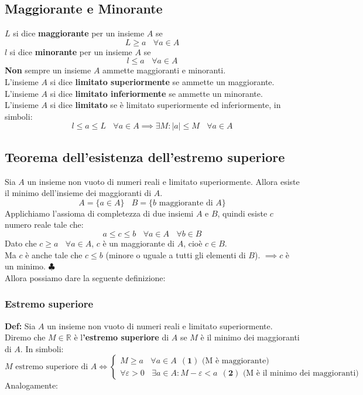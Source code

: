 \documentclass{article}
\newcommand{\R}{\mathbb{R}}
\begin{document}
\subsection{Maggiorante e Minorante}
$L$ si dice \textbf{maggiorante} per un insieme $A$ se
\[
    L \geq a \ \ \ \ \forall a \in A
\]
$l$ si dice \textbf{minorante} per un insieme $A$ se
\[
    l \leq a \ \ \ \ \forall a \in A
\]
\textbf{Non} sempre un insieme $A$ ammette maggioranti e minoranti.\\
L'insieme $A$ si dice \textbf{limitato superiormente} se ammette un maggiorante.\\
L'insieme $A$ si dice \textbf{limitato inferiormente} se ammette un minorante.\\
L'insieme $A$ si dice \textbf{limitato} se è limitato superiormente ed inferiormente, in simboli:
\[
    l\leq a \leq L \ \ \ \ \forall a \in A \implies \exists M : |a| \leq M \ \ \ \ \forall a \in A
\]

\subsection{Teorema dell'esistenza dell'estremo superiore}
Sia $A$ un insieme non vuoto di numeri reali e limitato superiormente. Allora
esiste il minimo dell'insieme dei maggioranti di $A$.
\[
    A = \{a\in A\} \ \ \ \ B = \{b \text{ maggiorante di } A\}
\]
Applichiamo l'assioma di completezza di due insiemi $A$ e $B$, quindi esiste
$c$ numero reale tale che:
\[
    a \leq c \leq b \ \ \ \ \forall a \in A \ \ \ \ \forall b \in B
\]
Dato che $c \geq a \ \ \ \ \forall a \in A$, $c$ è un maggiorante di $A$, cioè
$c \in B$.\\ Ma $c$ è anche tale che $c\leq b$ (minore o uguale a tutti gli
elementi di $B$). $\implies c$ è un minimo. $\clubsuit$\\ Allora possiamo dare
la seguente definizione:\\
\subsubsection{Estremo superiore}
\textbf{Def:} Sia $A$ un insieme non vuoto di numeri
reali e limitato superiormente. Diremo che $M\in \R$ è l\textbf{'estremo
    superiore} di $A$ se $M$ è il minimo dei maggioranti di $A$. In simboli:
\[
    M \text{ estremo superiore di } A \iff \begin{cases}
        M \geq a  \ \ \ \ \forall a \in A \ \ (\textbf{1}) \text{ (M è maggiorante)} \\
        \forall \varepsilon > 0 \ \ \ \ \exists a \in A : M - \varepsilon < a \ \ (\textbf{2}) \text{ (M è il minimo dei maggioranti)}
    \end{cases}
\]
Analogamente:
\end{document}
